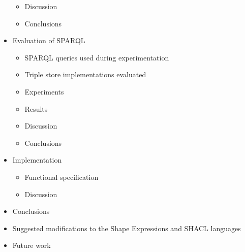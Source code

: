 \documentclass[a4paper, 10pt]{article}
\begin{document}
\begin{itemize}
\begin{itemize}
    \item Discussion

    \item Conclusions
  \end{itemize}

  \item Evaluation of SPARQL

  \begin{itemize}
    \item SPARQL queries used during experimentation
    \item Triple store implementations evaluated
    \item Experiments
    \item Results
    \item Discussion
    \item Conclusions
  \end{itemize}

  \item Implementation

  \begin{itemize}
    \item Functional specification
    \item Discussion
  \end{itemize}

  \item Conclusions

  \item Suggested modifications to the Shape Expressions and SHACL languages

  \item Future work
\end{itemize}
\end{document}
